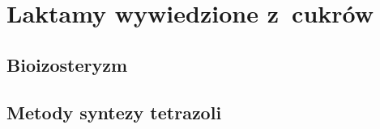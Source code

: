\section{Laktamy wywiedzione z~cukrów}\label{synthesis:sugars}
\subsection{Bioizosteryzm}\label{synthesis:sugars:bioisosterizm}
\subsection{Metody syntezy tetrazoli}\label{synthesis:sugars:synthesis}
